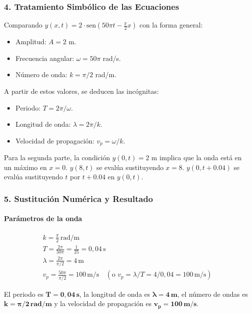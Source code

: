 \subsubsection*{4. Tratamiento Simbólico de las Ecuaciones}
Comparando $y(x,t)=2\cdot\text{sen}(50\pi t - \frac{\pi}{2}x)$ con la forma general:
\begin{itemize}
    \item Amplitud: $A = 2$ m.
    \item Frecuencia angular: $\omega = 50\pi$ rad/s.
    \item Número de onda: $k = \pi/2$ rad/m.
\end{itemize}
A partir de estos valores, se deducen las incógnitas:
\begin{itemize}
    \item Periodo: $T = 2\pi / \omega$.
    \item Longitud de onda: $\lambda = 2\pi / k$.
    \item Velocidad de propagación: $v_p = \omega/k$.
\end{itemize}
Para la segunda parte, la condición $y(0,t)=2$ m implica que la onda está en un máximo en $x=0$.
$y(8,t)$ se evalúa sustituyendo $x=8$.
$y(0, t+0.04)$ se evalúa sustituyendo $t$ por $t+0.04$ en $y(0,t)$.

\subsubsection*{5. Sustitución Numérica y Resultado}
\paragraph*{Parámetros de la onda}
\begin{gather}
    k = \frac{\pi}{2} \, \text{rad/m} \\
    T = \frac{2\pi}{50\pi} = \frac{1}{25} = 0,04 \, \text{s} \\
    \lambda = \frac{2\pi}{\pi/2} = 4 \, \text{m} \\
    v_p = \frac{50\pi}{\pi/2} = 100 \, \text{m/s} \quad (\text{o } v_p = \lambda/T = 4/0,04 = 100 \, \text{m/s})
\end{gather}
\begin{cajaresultado}
El periodo es $\boldsymbol{T=0,04\,s}$, la longitud de onda es $\boldsymbol{\lambda=4\,m}$, el número de ondas es $\boldsymbol{k=\pi/2 \, rad/m}$ y la velocidad de propagación es $\boldsymbol{v_p=100\,m/s}$.
\end{cajaresultado}
